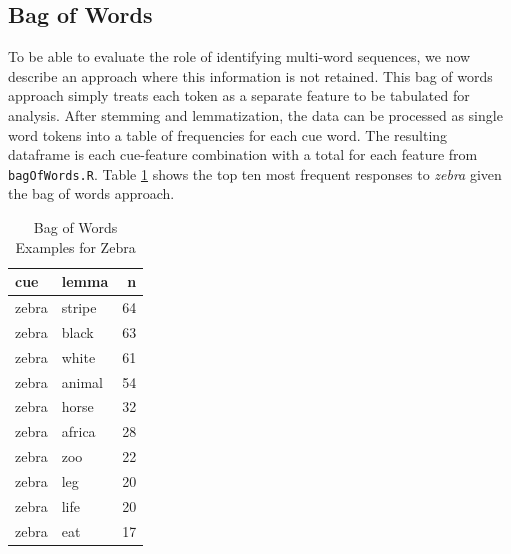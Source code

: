 \documentclass[man]{apa6}
\newenvironment{Shaded}{\begin{snugshade}}{\end{snugshade}}
\newcommand{\CommentTok}[1]{\textcolor[rgb]{0.56,0.35,0.01}{\textit{#1}}}
\newcommand{\DataTypeTok}[1]{\textcolor[rgb]{0.13,0.29,0.53}{#1}}
\newcommand{\KeywordTok}[1]{\textcolor[rgb]{0.13,0.29,0.53}{\textbf{#1}}}
\newcommand{\NormalTok}[1]{#1}
\newcommand{\OperatorTok}[1]{\textcolor[rgb]{0.81,0.36,0.00}{\textbf{#1}}}
\newcommand{\StringTok}[1]{\textcolor[rgb]{0.31,0.60,0.02}{#1}}
\begin{document}
\hypertarget{bag-of-words}{%
\subsection{Bag of Words}\label{bag-of-words}}

To be able to evaluate the role of identifying multi-word sequences, we now describe an approach where this information is not retained. This bag of words approach simply treats each token as a separate feature to be tabulated for analysis. After stemming and lemmatization, the data can be processed as single word tokens into a table of frequencies for each cue word. The resulting dataframe is each cue-feature combination with a total for each feature from \texttt{bagOfWords.R}. Table \ref{tab:tab5} shows the top ten most frequent responses to \emph{zebra} given the bag of words approach.

\scriptsize

\begin{Shaded}
\end{Shaded}

\normalsize

\begin{table}[t]

\caption{\label{tab:tab5}Bag of Words Examples for Zebra}
\centering
\begin{tabular}{llr}
\toprule
cue & lemma & n\\
\midrule
zebra & stripe & 64\\
zebra & black & 63\\
zebra & white & 61\\
zebra & animal & 54\\
zebra & horse & 32\\
\addlinespace
zebra & africa & 28\\
zebra & zoo & 22\\
zebra & leg & 20\\
zebra & life & 20\\
zebra & eat & 17\\
\bottomrule
\end{tabular}
\end{table}
\end{document}
